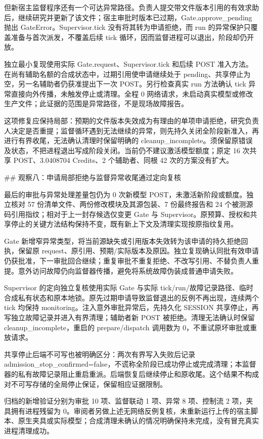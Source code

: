 但新宿主监督程序还有一个可达异常路径。负责人提交带文件版本引用的有效求助后，继续研究并更新了该文件；宿主审批时版本已过期，Gate.approve_pending 抛出 GateError。Supervisor.tick 没有将其转为申请拒绝，而 run 的异常保护只覆盖准备与首次派发，不覆盖后续 tick 循环，因而监督进程可以退出，阶段却仍开放。

独立最小复现使用实际 Gate.request、Supervisor.tick 和后续 POST 准入方法。在尚有辅助名额的合成状态中，过期引用使申请继续处于 pending、共享停止为空，另一名辅助者仍获准提出下一次 POST。另行检查真实 run 方法确认 tick 异常直接向外传播，未触发停止或清理。全程 0 网络请求，未启动真实模型或修改生产文件；此证据的范围是异常路径，不是现场故障报告。

这项修复应保持局部：预期的文件版本失效成为有理由的单项申请拒绝，研究负责人决定是否重提；监督循环遇到无法继续的异常，则先持久关闭全阶段新准入，再进行有界收尾，无法确认清理时保留明确的 cleanup_incomplete。须保留原错误及状态，不把进程退出写成阶段关闭。当前仍不建议激活模型额度；原定 16 次共享 POST、3.0408704 Credits、2 个辅助者、同根 42 次的方案没有扩大。

## 观察八：申请局部拒绝与监督异常收尾通过定向复核

最后的审批与异常处理差量包仍为 0 次新模型 POST，未激活新阶段或额度。独立核对 57 份清单文件、两份修改模块及其源包装、7 份最终报告和 24 个被测源码引用指纹；相对于上一封存候选仅变更 Gate 与 Supervisor。原预算、授权和共享停止的关键方法结构保持不变，既有新上下文及清理实现按原指纹复用。

Gate 新增窄异常类型，将当前源缺失或引用版本失效转为该申请的持久拒绝回执，保留原 request、原引用、预期/实际版本及原因。独立复现确认同批有效申请仍获批准，下一审批回合继续；重复审批不重复拒绝、不改写引用、不替负责人重提。意外访问故障仍向监督器传播，避免将系统故障伪装成普通申请失败。

Supervisor 的定向独立复核使用实际 Gate 与实际 tick/run/故障记录路径、临时合成私有状态和原本地锁。原先过期申请导致监督退出的反例不再出现，连续两个 tick 均保持 monitoring。注入意外审批异常后，先持久化 SESSION 共享停止，再写独立故障记录并进入有界清理；辅助者新 POST 被拒绝。清理无法确认时保留 cleanup_incomplete，重启的 prepare/dispatch 调用数为 0，不重试原坏审批或重放请求。

共享停止后端不可写也被明确区分：两次有界写入失败后记录 admission_stop_confirmed=false，不谎称全阶段已成功停止或完成清理；本监督器的私有故障记录阻止重启重派。后端恢复后继续停止和原收尾。这个结果不构成对不可写存储的全局停止保证，保留相应证据限制。

归档的新增验证分别为审批 10 项、监督联动 1 项、异常 8 项、控制流 2 项，夹具拥有进程残留为 0。审阅者另做上述无网络反例复核，未重新运行上传的宿主脚本、原生夹具或实际模型；合成清理未确认的情况明确保持未完成，没有冒充真实进程清理成功。

